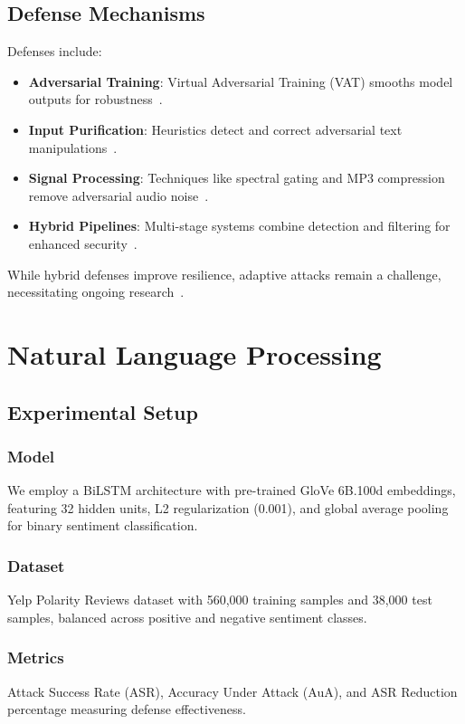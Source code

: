 \documentclass[conference]{IEEEtran}
\begin{document}
\subsection{Defense Mechanisms}
Defenses include:
\begin{itemize}
    \item \textbf{Adversarial Training}: Virtual Adversarial Training (VAT) smooths model outputs for robustness~\cite{miyato2017virtual}.
    \item \textbf{Input Purification}: Heuristics detect and correct adversarial text manipulations~\cite{morris2020textattack}.
    \item \textbf{Signal Processing}: Techniques like spectral gating and MP3 compression remove adversarial audio noise~\cite{andronic2020mp3}.
    \item \textbf{Hybrid Pipelines}: Multi-stage systems combine detection and filtering for enhanced security~\cite{zou2023universaltransferableadversarialattacks}.
\end{itemize}
While hybrid defenses improve resilience, adaptive attacks remain a challenge, necessitating ongoing research~\cite{akhtar2018threatadversarialattacksdeep}.

\section{Natural Language Processing}

\subsection{Experimental Setup}
\subsubsection{Model}
We employ a BiLSTM architecture with pre-trained GloVe 6B.100d embeddings, featuring 32 hidden units, L2 regularization (0.001), and global average pooling for binary sentiment classification.

\subsubsection{Dataset}
Yelp Polarity Reviews dataset with 560,000 training samples and 38,000 test samples, balanced across positive and negative sentiment classes.

\subsubsection{Metrics}
Attack Success Rate (ASR), Accuracy Under Attack (AuA), and ASR Reduction percentage measuring defense effectiveness.
\end{document}
